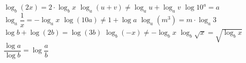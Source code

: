 \begin{questions}
\begin{parts}
\end{parts}

\question
{}

\begin{checkboxes}
\choice $\log_b (2x) = 2 \cdot \log_b x$
\correctchoice $\log_a(u+v) \neq  \log_a u + \log_a v$
\correctchoice $\log 10^a =a$
\correctchoice $\log_a \dfrac{1}{x}=-\log_a x$
\choice $\log(10a) \neq 1 + \log a$
\choice $\log_a(m^3) = m \cdot \log_a 3$
\choice $\log b + \log (2b) = \log (3b)$
\correctchoice $\log_b(-x) \neq - \log_b x$
\choice $\log_b \sqrt{x} = \sqrt{\log_b x}$ 
\choice $\dfrac{\log a}{\log b}= \log \dfrac{a}{b}$
\end{checkboxes}







\exnewpage
\question
{}






\end{questions}
